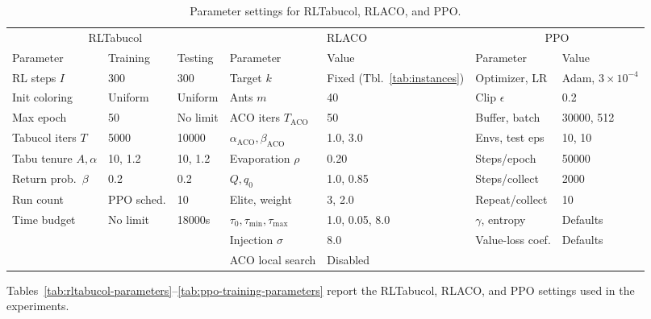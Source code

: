   \begin{table}[!htbp]
  \centering
  \caption{Parameter settings for RLTabucol, RLACO, and PPO.}
  \label{tab:all-parameters}
  \small
  \setlength{\tabcolsep}{8pt}
  \renewcommand{\arraystretch}{1.1}
  \begin{tabular}{@{}lll@{\hspace{2em}}ll@{\hspace{2em}}ll@{}}
  \toprule
  \multicolumn{3}{c}{RLTabucol} & \multicolumn{2}{c}{RLACO} & \multicolumn{2}{c}{PPO} \\
  \cmidrule(lr){1-3} \cmidrule(lr){4-5} \cmidrule(lr){6-7}
  Parameter & Training & Testing & Parameter & Value & Parameter & Value \\
  \midrule
  RL steps $I$        & 300      & 300      & Target $k$        & Fixed (Tbl.~\ref{tab:instances}) & Optimizer, LR  & Adam, $3{\times}10^{-4}$ \\
  Init coloring       & Uniform  & Uniform  & Ants $m$          & 40    & Clip $\epsilon$         & 0.2  \\
  Max epoch           & 50       & No limit & ACO iters $T_{\mathrm{ACO}}$ & 50    & Buffer, batch   & 30000, 512 \\
  Tabucol iters $T$   & 5000     & 10000   & $\alpha_{\mathrm{ACO}},\beta_{\mathrm{ACO}}$ & 1.0, 3.0 & Envs, test eps & 10, 10 \\
  Tabu tenure $A,\alpha$ & 10, 1.2 & 10, 1.2 & Evaporation $\rho$ & 0.20  & Steps/epoch   & 50000 \\
  Return prob.\ $\beta$ & 0.2    & 0.2     & $Q,q_0$           & 1.0, 0.85 & Steps/collect & 2000 \\
  Run count           & PPO sched. & 10    & Elite, weight     & 3, 2.0 & Repeat/collect & 10 \\
  Time budget         & No limit & 18000s  & $\tau_0,\tau_{\min},\tau_{\max}$ & 1.0, 0.05, 8.0 & $\gamma$, entropy & Defaults \\
                      &          &         & Injection $\sigma$ & 8.0   & Value-loss coef. & Defaults \\
                      &          &         & ACO local search   & Disabled & & \\
  \bottomrule
  \end{tabular}
  \end{table}
\else
  Tables~\ref{tab:rltabucol-parameters}--\ref{tab:ppo-training-parameters}
  report the RLTabucol, RLACO, and PPO settings used in the experiments.

